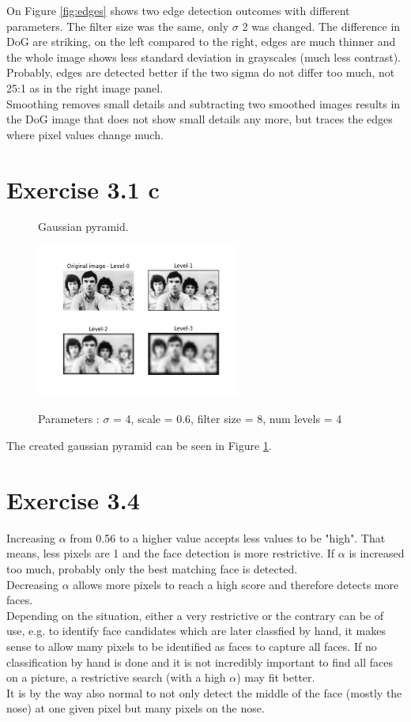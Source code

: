 \documentclass[a4paper,8pt]{extarticle}\usepackage[]{graphicx}\usepackage[]{color}
\begin{document}
On Figure \ref{fig:edges} shows two edge detection outcomes with different parameters. The filter size was the same, only $\sigma$ 2 was changed. The difference in DoG are striking, on the left compared to the right, edges are much thinner and the whole image shows less standard deviation in grayscales (much less contrast). Probably, edges are detected better if the two sigma do not differ too much, not 25:1 as in the right image panel. \\
Smoothing removes small details and subtracting two smoothed images results in the DoG image that does not show small details any more, but traces the edges where pixel values change much. 

\section{Exercise 3.1 c}
\begin{figure}
  \caption{Gaussian pyramid.}
  \centering
    \includegraphics[width=0.6\textwidth]{figs/gaussian.png}
  \label{fig:gauss}
  \caption{Parameters : $\sigma$ = 4, scale = 0.6, filter size = 8, num levels = 4}
\end{figure}
The created gaussian pyramid can be seen in Figure \ref{fig:gauss}. 

\section{Exercise 3.4}
Increasing $\alpha$ from 0.56 to a higher value accepts less values to be "high". That means, less pixels are 1 and the face detection is more restrictive. If $\alpha$ is increased too much, probably only the best matching face is detected. \\
Decreasing $\alpha$ allows more pixels to reach a high score and therefore detects more faces. \\
Depending on the situation, either a very restrictive or the contrary can be of use, e.g. to identify face candidates which are later classfied by hand, it makes sense to allow many pixels to be identified as faces to capture all faces. If no classification by hand is done and it is not incredibly important to find all faces on a picture, a restrictive search (with a high $\alpha$) may fit better. \\
It is by the way also normal to not only detect the middle of the face (mostly the nose) at one given pixel but many pixels on the nose.
\end{document}
